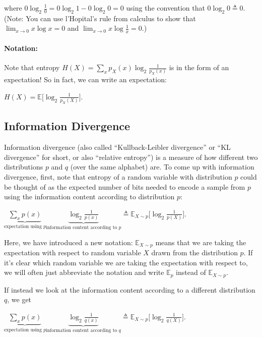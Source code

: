 \documentclass[6008notes.tex]{subfiles}
\begin{document}
where $0 \log _2 \frac10 = 0 \log _2 1 - 0 \log _2 0 = 0$ using the convention that $0 \log _2 0 \triangleq 0$. (Note: You can use l'Hopital's rule from calculus to show that $\lim _{x\rightarrow 0} x \log x = 0$ and $\lim _{x\rightarrow 0} x \log \frac1x = 0$.)

\paragraph{Notation:} Note that entropy $H(X) = \sum _ x p_ X(x) \log _2 \frac{1}{p_ X(x)}$ is in the form of an expectation! So in fact, we can write an expectation:

{\centering$H(X) = \mathbb {E}\Big[\log _2 \frac{1}{p_ X(X)}\Big].$ \par}
 
\subsection{Information Divergence}

Information divergence (also called ``Kullback-Leibler divergence'' or ``KL divergence'' for short, or also ``relative entropy'') is a measure of how different two distributions $p$ and $q$ (over the same alphabet) are. To come up with information divergence, first, note that entropy of a random variable with distribution $p$ could be thought of as the expected number of bits needed to encode a sample from $p$ using the information content according to distribution $p$:

{\centering$\underbrace{\sum _{x}p(x)}_{\text {expectation using }p}\underbrace{\log _{2}\frac{1}{p(x)}}_{\text {information content according to }p}\triangleq \mathbb {E}_{X \sim p}\Big[\log _{2}\frac{1}{p(X)}\Big].$ \par}
 
Here, we have introduced a new notation: $\mathbb {E}_{X \sim p}$ means that we are taking the expectation with respect to random variable $X$ drawn from the distribution $p$. If it's clear which random variable we are taking the expectation with respect to, we will often just abbreviate the notation and write $\mathbb {E}_{p}$ instead of $\mathbb {E}_{X \sim p}$.

If instead we look at the information content according to a different distribution $q$, we get

{\centering$\underbrace{\sum _{x}p(x)}_{\text {expectation using }p}\underbrace{\log _{2}\frac{1}{q(x)}}_{\text {information content according to }q}\triangleq \mathbb {E}_{X \sim p}\Big[\log _{2}\frac{1}{q(X)}\Big].$ \par}
 
\end{document}
